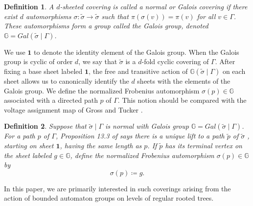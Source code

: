 \documentclass{article}
\newtheorem{mydef}{Definition}[section]
\newcommand{\G}{\Gamma}
\newcommand{\tG}{\widetilde{\sigma}}
\newcommand{\gid}{\mathbf{1}}
\newcommand{\Gal}{\mathbb{G}}
\begin{document}
\begin{mydef} \label{Def:Galois_cover}
A $d$-sheeted covering is called a \emph{normal} or \emph{Galois} covering if there exist $d$ automorphisms $\sigma: \tG \rightarrow \tG$ such that $\pi(\sigma(v)) = \pi(v)$ for all $v \in \G$. These automorphisms form a group called the Galois group, denoted $\Gal = Gal(\tG\mid\G)$.\end{mydef} 

We use $\gid$ to denote the identity element of the Galois group. When the Galois group is cyclic of order $d$, we say that $\tG$ is a $d$-fold cyclic covering of $\G$. After fixing a base sheet labeled $\gid$, the free and transitive action of $\Gal(\tG\mid\G)$ on each sheet allows us to canonically identify the $d$ sheets with the elements of the Galois group. We define the normalized Frobenius automorphism $\sigma(p) \in \Gal$ associated with a directed path $p$ of $\G$. This notion should be compared with the voltage assignment map of Gross and Tucker \cite{gross2001topological}.

\begin{mydef} \label{Def:nfauto}Suppose that $\tG\mid\G$ is normal with Galois group $\Gal = Gal(\tG\mid\G)$. For a path $p$ of $\G$, Proposition 13.3 of \cite{terras2010zeta} says there is a unique lift to a path $\tilde{p}$ of $\tG$ , starting on sheet $\gid$, having the same length as $p$. If $\tilde{p}$ has its terminal vertex on the sheet labeled $g \in \Gal$, define the normalized Frobenius automorphism $\sigma(p) \in \Gal$ by $$\sigma(p) \coloneqq g.$$
\end{mydef}
In this paper, we are primarily interested in such coverings arising from the action of bounded automaton groups on levels of regular rooted trees.
\end{document}

